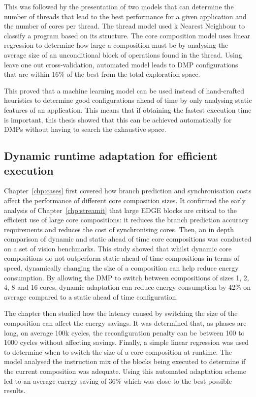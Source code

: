 This was followed by the presentation of two models that can determine the number of threads that lead to the best performance for a given application and the number of cores per thread.
The thread model used k Nearest Neighbour to classify a program based on its structure.
The core composition model uses linear regression to determine how large a composition must be by analysing the average size of an unconditional block of operations found in the thread.
Using leave one out cross-validation, automated model leads to DMP configurations that are within 16\% of the best from the total exploration space.

This proved that a machine learning model can be used instead of hand-crafted heuristics to determine good configurations ahead of time by only analysing static features of an application.
This means that if obtaining the fastest execution time is important, this thesis showed that this can be achieved automatically for DMPs without having to search the exhaustive space.

\subsection{Dynamic runtime adaptation for efficient execution}

Chapter~\ref{chp:cases} first covered how branch prediction and synchronisation costs affect the performance of different core composition sizes.
It confirmed the early analysis of Chapter~\ref{chp:streamit} that large EDGE blocks are critical to the efficient use of large core compositions: it reduces the branch prediction accuracy requirements and reduces the cost of synchronising cores.
Then, an in depth comparison of dynamic and static ahead of time core compositions was conducted on a set of vision benchmarks.
This study showed that whilst dynamic core compositions do not outperform static ahead of time compositions in terms of speed, dynamically changing the size of a composition can help reduce energy consumption.
By allowing the DMP to switch between compositions of sizes 1, 2, 4, 8 and 16 cores, dynamic adaptation can reduce energy consumption by 42\% on average compared to a static ahead of time configuration.

The chapter then studied how the latency caused by switching the size of the composition can affect the energy savings.
It was determined that, as phases are long, on average 100k cycles, the reconfiguration penalty can be between 100 to 1000 cycles without affecting savings.
Finally, a simple linear regression was used to determine when to switch the size of a core composition at runtime.
The model analysed the instruction mix of the blocks being executed to determine if the current composition was adequate.
Using this automated adaptation scheme led to an average energy saving of 36\% which was close to the best possible results.

